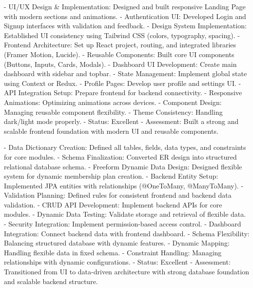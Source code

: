 \documentclass[
  12pt,
  a4paperpaper,
]{report}
\begin{document}
%
{- UI/UX Design \& Implementation: Designed and built responsive Landing Page with modern sections and animations.\newline
- Authentication UI: Developed Login and Signup interfaces with validation and feedback.\newline
- Design System Implementation: Established UI consistency using Tailwind CSS (colors, typography, spacing).\newline
- Frontend Architecture: Set up React project, routing, and integrated libraries (Framer Motion, Lucide).\newline
- Reusable Components: Built core UI components (Buttons, Inputs, Cards, Modals).}%
{- Dashboard UI Development: Create main dashboard with sidebar and topbar.\newline
- State Management: Implement global state using Context or Redux.\newline
- Profile Pages: Develop user profile and settings UI.\newline
- API Integration Setup: Prepare frontend for backend connectivity.}%
{- Responsive Animations: Optimizing animations across devices.\newline
- Component Design: Managing reusable component flexibility.\newline
- Theme Consistency: Handling dark/light mode properly.}%
{- Status: Excellent\newline
- Assessment: Built a strong and scalable frontend foundation with modern UI and reusable components.}

%
{- Data Dictionary Creation: Defined all tables, fields, data types, and constraints for core modules.\newline
- Schema Finalization: Converted ER design into structured relational database schema.\newline
- Freeform Dynamic Data Design: Designed flexible system for dynamic membership plan creation.\newline
- Backend Entity Setup: Implemented JPA entities with relationships (@OneToMany, @ManyToMany).\newline
- Validation Planning: Defined rules for consistent frontend and backend data validation.}%
{- CRUD API Development: Implement backend APIs for core modules.\newline
- Dynamic Data Testing: Validate storage and retrieval of flexible data.\newline
- Security Integration: Implement permission-based access control.\newline
- Dashboard Integration: Connect backend data with frontend dashboard.}%
{- Schema Flexibility: Balancing structured database with dynamic features.\newline
- Dynamic Mapping: Handling flexible data in fixed schema.\newline
- Constraint Handling: Managing relationships with dynamic configurations.}%
{- Status: Excellent\newline
- Assessment: Transitioned from UI to data-driven architecture with strong database foundation and scalable backend structure.}
\end{document}
